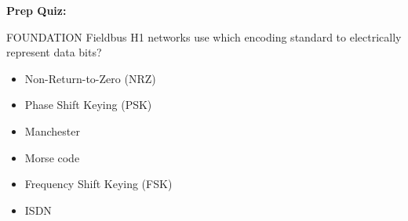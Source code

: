 \vfil \eject

\noindent
{\bf Prep Quiz:}

FOUNDATION Fieldbus H1 networks use which encoding standard to electrically represent data bits?

\begin{itemize}
\item{} Non-Return-to-Zero (NRZ)
\vskip 5pt 
\item{} Phase Shift Keying (PSK)
\vskip 5pt 
\item{} Manchester
\vskip 5pt 
\item{} Morse code
\vskip 5pt 
\item{} Frequency Shift Keying (FSK)
\vskip 5pt 
\item{} ISDN
\end{itemize}



